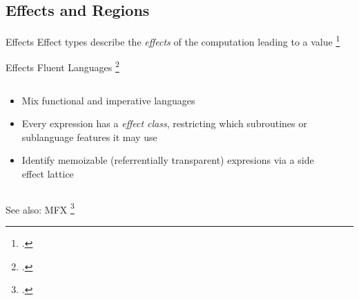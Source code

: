 \documentclass[aspectratio=169]{beamer}
\begin{document}
\subsection{Effects and Regions}

\begin{frame}{Effects}
    Effect types describe the \emph{effects} of the computation leading to a value \footcite{pierce_advanced_2005}
    \\
\end{frame}

\begin{frame}{Effects}
    Fluent Languages \footcite{gifford_integrating_1986}
  \begin{columns}[T]
    \begin{column}{0.68\textwidth}
        \begin{itemize}
            \item Mix functional and imperative languages %
            \item Every expression has a \emph{effect class}, restricting which subroutines or sublanguage features it may use
            \item Identify memoizable (referrentially transparent) expresions via a side effect lattice %
        \end{itemize}
    \end{column}

    \begin{column}{0.30\textwidth}
    \footnotesize{
    }
    \end{column}
  \end{columns}
    See also: MFX \footcite{lucassen_polymorphic_1988} %
\end{frame}

\end{document}
